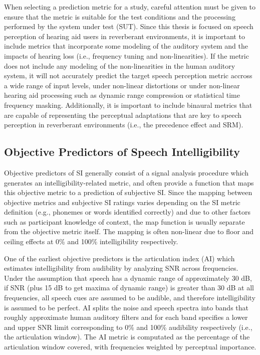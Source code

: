 When selecting a prediction metric for a study, careful attention must be given to ensure that the metric is suitable for the test conditions and the processing performed by the system under test (SUT). Since this thesis is focused on speech perception of hearing aid users in reverberant environments, it is important to include metrics that incorporate some modeling of the auditory system and the impacts of hearing loss (i.e., frequency tuning and non-linearities). If the metric does not include any modeling of the non-linearities in the human auditory system, it will not accurately predict the target speech perception metric accross a wide range of input levels, under non-linear distortions or under non-linear hearing aid processing such as dynamic range compression or statistical time frequency masking. Additionally, it is important to include binaural metrics that are capable of representing the perceptual adaptations that are key to speech perception in reverberant environments (i.e., the precedence effect and SRM).

\subsection{Objective Predictors of Speech Intelligibility}

Objective predictors of SI generally consist of a signal analysis procedure which generates an intelligibility-related metric, and often provide a function that maps this objective metric to a prediction of subjective SI. Since the mapping between objective metrics and subjective SI ratings varies depending on the SI metric definition (e.g., phonemes or words identified correctly) and due to other factors such as participant knowledge of context, the map function is usually separate from the objective metric itself. The mapping is often non-linear due to floor and ceiling effects at 0\% and 100\% intelligibility respectively.

One of the earliest objective predictors is the articulation index (AI) \citep{kryter1962methods} which estimates intelligibility from audibility by analyzing SNR across frequencies. Under the assumption that speech has a dynamic range of approximately 30 dB, if SNR (plus 15 dB to get maxima of dynamic range) is greater than 30 dB at all frequencies, all speech cues are assumed to be audible, and therefore intelligibility is assumed to be perfect. AI splits the noise and speech spectra into bands that roughly approximate human auditory filters and for each band specifies a lower and upper SNR limit corresponding to 0\% and 100\% audibility respectively (i.e., the articulation window). The AI metric is computated as the percentage of the articulation window covered, with frequencies weighted by perceptual importance.

